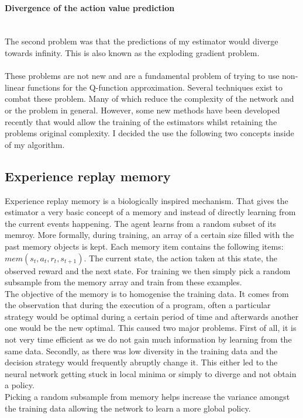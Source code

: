 \paragraph{Divergence of the action value prediction}\mbox{}\\
The second problem was that the predictions of my estimator would diverge towards infinity. This is also known as the exploding gradient problem.\\
\mbox{}\\
These problems are not new and are a fundamental problem of trying to use non-linear functions for the Q-function approximation. Several techniques exist to combat these problem. Many of which reduce the complexity of the network and or the problem in general. However, some new methods have been developed recently that would allow the training of the estimators whilst retaining the problems original complexity. I decided the use the following two concepts inside of my algorithm.
\subsection{Experience replay memory}
Experience replay memory is a biologically inspired mechanism. That gives the estimator a very basic concept of a memory and instead of directly learning from the current events happening. The agent learns from a random subset of its memroy. More formally, during training, an array of a certain size filled with the past memory objects is kept. Each memory item contains the following items: $mem(s_t, a_t, r_t, s_{t+1})$. The current state, the action taken at this state, the observed reward and the next state. For training we then simply pick a random subsample from the memory array and train from these examples.
\\
The objective of the memory is to homogenise the training data. It comes from the observation that during the execution of a program, often a particular strategy would be optimal during a certain period of time and afterwards another one would be the new optimal. This caused two major problems. First of all, it is not very time efficient as we do not gain much information by learning from the same data. Secondly, as there was low diversity in the training data and the decision strategy would frequently abruptly change it. This either led to the neural network getting stuck in local minima or simply to diverge and not obtain a policy. \\
Picking a random subsample from memory helps increase the variance amongst the training data allowing the network to learn a more global policy. 
